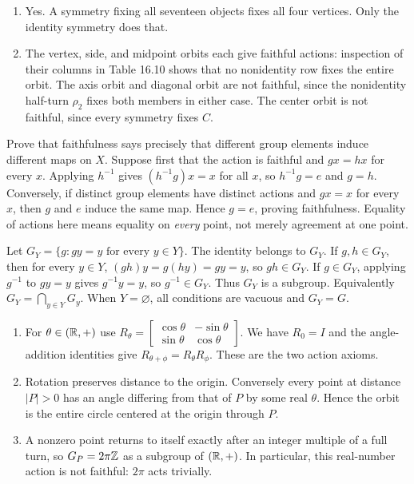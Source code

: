 \begin{enumerate}[label=(\alph*)]
\item Yes. A symmetry fixing all seventeen objects fixes all four vertices.
Only the identity symmetry does that.
\item The vertex, side, and midpoint orbits each give faithful actions:
inspection of their columns in Table 16.10 shows that no nonidentity row
fixes the entire orbit. The axis orbit and diagonal orbit are not faithful,
since the nonidentity half-turn $\rho_2$ fixes both members in either case.
The center orbit is not faithful, since every symmetry fixes $C$.
\end{enumerate}

\goal Prove that faithfulness says precisely that different group elements
induce different maps on $X$.
Suppose first that the action is faithful and $gx=hx$ for every $x$.
Applying $h^{-1}$ gives $(h^{-1}g)x=x$ for all $x$, so $h^{-1}g=e$ and $g=h$.
Conversely, if distinct group elements have distinct actions and $gx=x$ for
every $x$, then $g$ and $e$ induce the same map. Hence $g=e$, proving
faithfulness. Equality of actions here means equality on \emph{every} point,
not merely agreement at one point.

Let $G_Y=\{g:gy=y\text{ for every }y\in Y\}$. The identity belongs to $G_Y$.
If $g,h\in G_Y$, then for every $y\in Y$,
$(gh)y=g(hy)=gy=y$, so $gh\in G_Y$. If $g\in G_Y$, applying $g^{-1}$ to
$gy=y$ gives $g^{-1}y=y$, so $g^{-1}\in G_Y$.
Thus $G_Y$ is a subgroup. Equivalently $G_Y=\bigcap_{y\in Y}G_y$.
When $Y=\varnothing$, all conditions are vacuous and $G_Y=G$.

\begin{enumerate}[label=(\alph*)]
\item For $\theta\in(\mathbb{R},+)$ use
$R_\theta=\begin{bmatrix}\cos\theta&-\sin\theta\\\sin\theta&\cos\theta\end{bmatrix}$.
We have $R_0=I$ and the angle-addition identities give
$R_{\theta+\phi}=R_\theta R_\phi$. These are the two action axioms.
\item Rotation preserves distance to the origin. Conversely every point
at distance $|P|>0$ has an angle differing from that of $P$ by some real
$\theta$. Hence the orbit is the entire circle centered at the origin
through $P$.
\item A nonzero point returns to itself exactly after an integer multiple
of a full turn, so $G_P=2\pi\mathbb{Z}$ as a subgroup of $(\mathbb{R},+)$.
In particular, this real-number action is not faithful: $2\pi$ acts trivially.
\end{enumerate}

